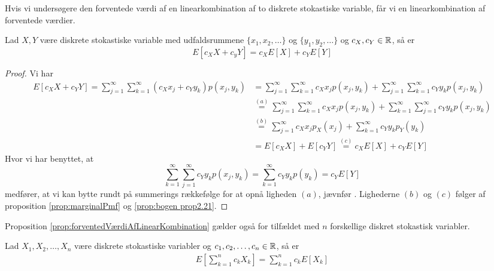 Hvis vi undersøgere den forventede værdi af en linearkombination af to diskrete stokastiske variable, får vi en linearkombination af forventede værdier.
\begin{prop}\label{prop:forventedVærdiAfLinearKombination} %
Lad $X, Y$ være diskrete stokastiske variable med udfaldsrummene $\{x_1, x_2, \ldots \}$ og $\{y_1, y_2, \ldots \}$ og $c_X, c_Y \in \mathbb{R}$, så er
\begin{equation*}
    E[c_XX+c_yY] = c_XE[X] + c_YE[Y]
\end{equation*}


\end{prop}
\begin{proof}
Vi har
\begin{align*}
    E[c_X X + c_Y Y] = \sum^\infty_{j = 1} \sum^\infty_{k = 1} (c_X x_j + c_Y y_k) p(x_j, y_k) &= \sum^\infty_{j = 1} \sum^\infty_{k = 1} c_X x_j p(x_j, y_k) + \sum^\infty_{j = 1} \sum^\infty_{k = 1} c_Y y_k p(x_j, y_k) \\
    &\stackrel{(a)}= \sum^\infty_{j = 1} \sum^\infty_{k = 1} c_X x_j p(x_j, y_k) + \sum^\infty_{k = 1} \sum^\infty_{j = 1} c_Y y_k p(x_j, y_k) \\
    &\stackrel{(b)}= \sum^\infty_{j = 1} c_X x_j p_X(x_j) + \sum^\infty_{k = 1} c_Y y_k p_Y(y_k)\\
    &= E[c_X X] +  E[c_Y Y] \stackrel{(c)}= c_X E[X] + c_Y E[Y]
\end{align*}
Hvor vi har benyttet, at 
\begin{equation*}
    \sum^\infty_{k = 1} \sum^\infty_{j = 1} c_Y y_k p(x_j, y_k) = \sum^\infty_{k = 1} c_Y y_k p(y_k) = c_YE[Y]
\end{equation*}
medfører, at vi kan bytte rundt på summerings rækkefølge for at opnå ligheden $(a)$, jævnfør \cite{horiaPowerSerieNoter}.
Lighederne $(b)$ og $(c)$ følger af proposition \ref{prop:marginalPmf} og \ref{prop:bogen prop2.21}.
\end{proof}

Proposition \ref{prop:forventedVærdiAfLinearKombination} gælder også for tilfældet med $n$ forskellige diskret stokastisk variabler.
\begin{cor}\label{cor:sumAfDiskreteVariable} %
Lad $X_1, X_2, \ldots, X_n$ være diskrete stokastiske variabler og $c_1, c_2, \ldots, c_n \in \mathbb{R}$, så er 
\begin{align*}
    E\left[\sum^n_{k = 1} c_k X_k\right] = \sum^n_{k = 1} c_k E[X_k]
\end{align*}
\end{cor}

